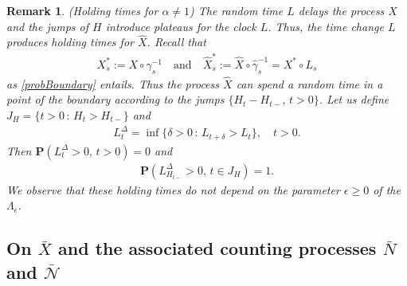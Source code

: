 \documentclass[11pt,a4paper]{article}
\newtheorem{remark}{Remark}[section]
\begin{document}
\begin{remark}
\label{rmk:HThatX} 
(Holding times for $\alpha \neq 1$) The random time $L$ delays the process $X$ and the jumps of $H$ introduce plateaus for the clock $L$. Thus, the time change $L$ produces holding times for $\hat{X}$. Recall that
\begin{align*}
X^*_s := X \circ \gamma^{-1}_s \quad \textrm{and} \quad \hat{X}^*_s := \hat{X} \circ \hat{\gamma}^{-1}_s = X^* \circ L_s
\end{align*}
as \eqref{probBoundary} entails. Thus the process $\hat{X}$ can spend a random time in a point of the boundary according to the jumps $\{H_t - H_{t-},\, t>0\}$. Let us define $J_H = \{t >0\,:\, H_{t} > H_{t-}\}$ and 
\begin{align*}
L^\Delta_t = \inf\{\delta>0\,:\, L_{t+\delta} > L_t\}, \quad t>0.
\end{align*}
Then $\mathbf{P}(L^\Delta_t >0,\, t>0) = 0$ and
\begin{align*}
\mathbf{P}(L^\Delta_{H_{t-}}> 0,\, t \in J_H) = 1.
\end{align*}
We observe that these holding times do not depend on the parameter $\epsilon\geq 0$ of the $\Lambda_\epsilon$. 
\end{remark}




\subsection{On $\bar{X}$ and the associated counting processes $\bar{N}$ and $\bar{\mathcal{N}}$}
\label{SecSubXbar}
\end{document}
